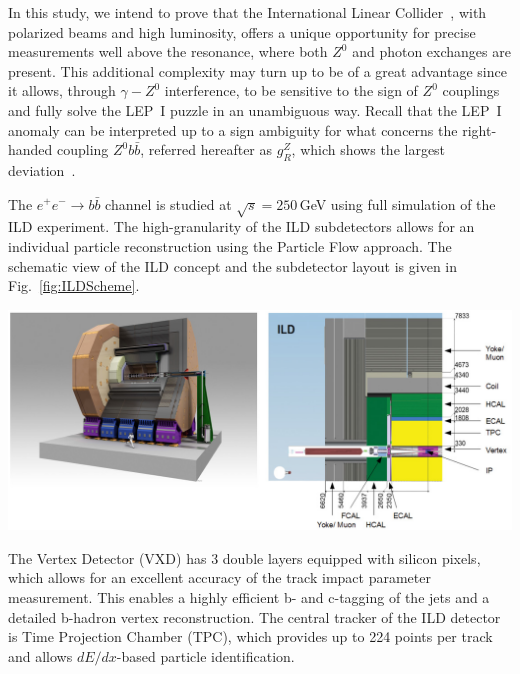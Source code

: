 \documentclass[a0,portrait]{a0poster}
\begin{document}
\begin{multicols}{2}
In this study, we intend to prove that the International Linear Collider~\cite{bib:ILC}, with polarized beams and 
high luminosity, offers a unique opportunity for precise measurements well above the resonance, where both $Z^0$ and photon exchanges are present. 
This additional complexity may turn up to be of a great advantage since it allows, through $\gamma - Z^0$ interference, to be sensitive to the sign of $Z^0$ couplings and fully solve the LEP~I puzzle in an unambiguous way. 
Recall that the LEP~I anomaly can be interpreted up to a sign ambiguity for what concerns the right‐handed coupling $Z^0 b\bar{b}$, referred 
hereafter as $g_R^Z$, which shows the largest deviation~\cite{bib:RSTOP}.  


The $e^+ e^-\to b\bar{b}$ channel is studied at $\sqrt{s}=250$\,GeV using full simulation of the ILD experiment.
The high-granularity of the ILD subdetectors allows for an individual particle reconstruction using the Particle Flow approach.
The schematic view of the ILD concept and the subdetector layout is given in Fig.~\ref{fig:ILDScheme}.
\begin{center}\vspace{1cm}
	\centering
	\label{fig:ILDScheme}
	\includegraphics[width=0.8\linewidth]{figures/ild.png}
\end{center}\vspace{1cm}
The Vertex Detector (VXD) has 3 double layers equipped with silicon pixels, which allows for an excellent accuracy of the track impact parameter measurement.  
This enables a highly efficient b- and c-tagging of the jets and a detailed b-hadron vertex reconstruction. 
The central tracker of the ILD detector is Time Projection Chamber (TPC), which provides up to 224 points per track and allows $dE/dx$-based particle identification.



\end{multicols}
\end{document}
